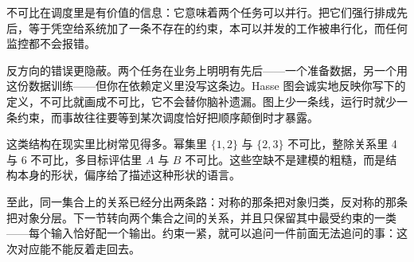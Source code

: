 不可比在调度里是有价值的信息：它意味着两个任务可以并行。把它们强行排成先后，等于凭空给系统加了一条不存在的约束，本可以并发的工作被串行化，而任何监控都不会报错。

反方向的错误更隐蔽。两个任务在业务上明明有先后——一个准备数据，另一个用这份数据训练——但你在依赖定义里没写这条边。Hasse 图会诚实地反映你写下的定义，不可比就画成不可比，它不会替你脑补遗漏。图上少一条线，运行时就少一条约束，而事故往往要等到某次调度恰好把顺序颠倒时才暴露。

这类结构在现实里比树常见得多。幂集里 \(\{1,2\}\) 与 \(\{2,3\}\) 不可比，整除关系里 4 与 6 不可比，多目标评估里 \(A\) 与 \(B\) 不可比。这些空缺不是建模的粗糙，而是结构本身的形状，偏序给了描述这种形状的语言。

至此，同一集合上的关系已经分出两条路：对称的那条把对象归类，反对称的那条把对象分层。下一节转向两个集合之间的关系，并且只保留其中最受约束的一类——每个输入恰好配一个输出。约束一紧，就可以追问一件前面无法追问的事：这次对应能不能反着走回去。
